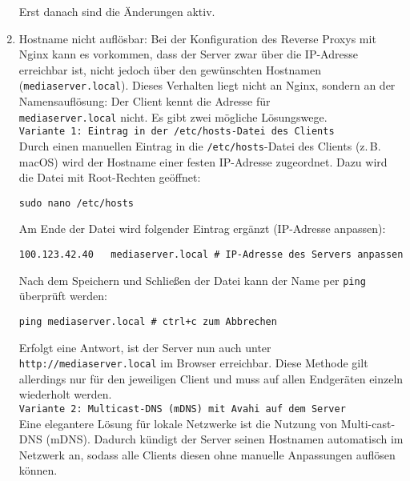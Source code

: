 \documentclass[12pt,a4paper]{report}
\begin{document}
\begin{enumerate}
      Erst danach sind die Änderungen aktiv.

      \item Hostname nicht auflösbar:
      Bei der Konfiguration des Reverse Proxys mit Nginx kann es vorkommen, dass der Server zwar über die IP-Adresse erreichbar ist, 
      nicht jedoch über den gewünschten Hostnamen (\texttt{mediaserver.local}).  
      Dieses Verhalten liegt nicht an Nginx, sondern an der Namensauflösung: Der Client kennt die Adresse für\\
      \texttt{mediaserver.local} nicht.  
      Es gibt zwei mögliche Lösungswege.
      \\
      \newline
      \texttt{Variante 1: Eintrag in der \texttt{/etc/hosts}-Datei des Clients}\\
      Durch einen manuellen Eintrag in die \texttt{/etc/hosts}-Datei des Clients (z.\,B. macOS) wird der Hostname einer festen IP-Adresse zugeordnet.  
      Dazu wird die Datei mit Root-Rechten geöffnet:

      \begin{verbatim}
sudo nano /etc/hosts
      \end{verbatim}

      Am Ende der Datei wird folgender Eintrag ergänzt (IP-Adresse anpassen):

      \begin{verbatim}
100.123.42.40   mediaserver.local # IP-Adresse des Servers anpassen
      \end{verbatim}

      Nach dem Speichern und Schließen der Datei kann der Name per \texttt{ping} überprüft werden:

      \begin{verbatim}
ping mediaserver.local # ctrl+c zum Abbrechen
      \end{verbatim}

      Erfolgt eine Antwort, ist der Server nun auch unter\\ \texttt{http://mediaserver.local} im Browser erreichbar.  
      Diese Methode gilt allerdings nur für den jeweiligen Client und muss auf allen Endgeräten einzeln wiederholt werden.
      \\
      \newline
      \texttt{Variante 2: Multicast-DNS (mDNS) mit Avahi auf dem Server}\\
      Eine elegantere Lösung für lokale Netzwerke ist die Nutzung von Multi-cast-DNS (\acs{mDNS}).  
      Dadurch kündigt der Server seinen Hostnamen automatisch im Netzwerk an, sodass alle Clients diesen ohne manuelle Anpassungen auflösen können.


\end{enumerate}
\end{document}
